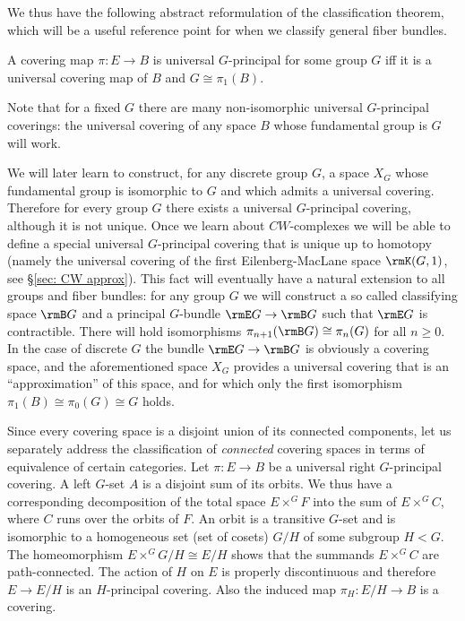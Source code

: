 We thus have the following abstract reformulation of the classification theorem, which will be a useful reference point for when we classify general fiber bundles.

\begin{thm}
    A covering map $\pi:E\to B$ is universal $G$-principal for some group $G$ iff it is a universal covering map of $B$ and $G\cong \pi_1(B)$.
\end{thm}
Note that for a fixed $G$ there are many non-isomorphic universal $G$-principal coverings: the universal covering of any space $B$ whose fundamental group is $G$ will work. 

\begin{rem}\label{rem: classifying space for discrete G}
    We will later learn to construct, for any discrete group $G$, a space $X_G$ whose fundamental group is isomorphic to $G$ and which admits a universal covering. Therefore for every group $G$ there exists a universal $G$-principal covering, although it is not unique. Once we learn about $CW$-complexes we will be able to define a special universal $G$-principal covering that is unique up to homotopy (namely the universal covering of the first Eilenberg-MacLane space $\rmK(G,1)$, see \S\ref{sec: CW approx}). This fact will eventually have a natural extension to all groups and fiber bundles: for any group $G$ we will construct a so called classifying space $\rmB G$ and a principal $G$-bundle $\rmE G\to \rmB G$ such that $\rmE G$ is contractible. There will hold isomorphisms $\pi_{n+1}(\rmB G)\cong \pi_{n}(G)$ for all $n\geq 0$. In the case of discrete $G$ the bundle $\rmE G\to \rmB G$ is obviously a covering space, and the aforementioned space $X_G$ provides a universal covering that is an ``approximation'' of this space, and for which only the first isomorphism $\pi_1(B)\cong \pi_0(G)\cong G$ holds.
\end{rem}

Since every covering space is a disjoint union of its connected components, let us separately address the classification of \emph{connected} covering spaces in terms of equivalence of certain categories. Let $\pi:E\to B$ be a universal right $G$-principal covering. A left $G$-set $A$ is a disjoint sum of its orbits. We thus have a corresponding decomposition of the total space $E\times^G F$ into the sum of $E\times^G C$, where $C$ runs over the orbits of $F$. An orbit is a transitive $G$-set and is isomorphic to a homogeneous set (set of cosets) $G\slash H$ of some subgroup $H<G$. The homeomorphism $E\times^G G\slash H\cong E\slash H$ shows that the summands $E\times^G C$ are path-connected. The action of $H$ on $E$ is properly discontinuous and therefore $E\to E\slash H$ is an $H$-principal covering. Also the induced map $\pi_H:E\slash H\to B$ is a covering.

